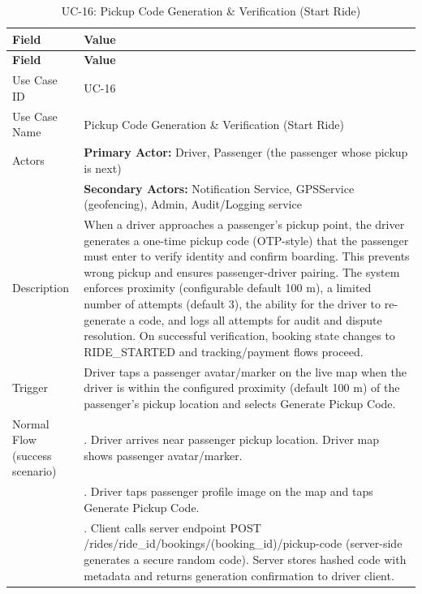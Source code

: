 \begin{longtable}{|>{\raggedright\arraybackslash}p{4cm}|>{\raggedright\arraybackslash}p{11cm}|}
\caption{UC-16: Pickup Code Generation \& Verification (Start Ride)}
\label{tab:uc-16} \\
\hline
\rowcolor{lightgray!30}
\textbf{Field} & \textbf{Value} \\
\hline
\endfirsthead
\hline
\rowcolor{lightgray!30}
\textbf{Field} & \textbf{Value} \\
\hline
\endhead
\hline
\endfoot
\hline
\endlastfoot
Use Case ID & UC-16 \\
\hline
Use Case Name & Pickup Code Generation \& Verification (Start Ride) \\
\hline
Actors & \textbf{Primary Actor:} Driver, Passenger (the passenger whose pickup is next) \\
& \textbf{Secondary Actors:} Notification Service, GPSService (geofencing), Admin, Audit/Logging service \\
\hline
Description & When a driver approaches a passenger's pickup point, the driver generates a one-time pickup code (OTP-style) that the passenger must enter to verify identity and confirm boarding. This prevents wrong pickup and ensures passenger-driver pairing. The system enforces proximity (configurable default 100 m), a limited number of attempts (default 3), the ability for the driver to re-generate a code, and logs all attempts for audit and dispute resolution. On successful verification, booking state changes to RIDE\_STARTED and tracking/payment flows proceed. \\
\hline
Trigger & Driver taps a passenger avatar/marker on the live map when the driver is within the configured proximity (default 100 m) of the passenger's pickup location and selects Generate Pickup Code. \\
\hline
Normal Flow (success scenario) & 1. Driver arrives near passenger pickup location. Driver map shows passenger avatar/marker. \\
& 2. Driver taps passenger profile image on the map and taps Generate Pickup Code. \\
& 3. Client calls server endpoint POST /rides/ride\_id/bookings/(booking\_id)/pickup-code (server-side generates a secure random code). Server stores hashed code with metadata and returns generation confirmation to driver client. \\

\end{longtable}
